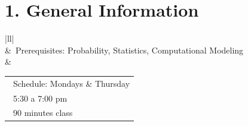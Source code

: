 \documentclass[letterpaper,11pt]{article}
\begin{document}
\section{1. General Information}
\begin{table}[h!]
\centering
\begin{tabular}{|ll|}
\hline
{}                                                                                                                                                                                        \\ \hline
{}                                                                                                                             &~Prerequisites: Probability, Statistics, Computational Modeling~~~                                                                    \\ \hline
{} & \begin{tabular}[c]{@{}l@{}}~Schedule: Mondays \& Thursday\\ ~5:30 a 7:00 pm\\~90 minutes class\end{tabular} \\ \hline
\end{tabular}
\end{table}
\end{document}
